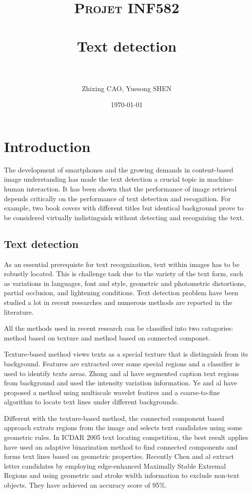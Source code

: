 \documentclass[paper=a4, french, 11pt]{scrartcl}
\title{	
\normalfont \normalsize 
\textsc{Projet INF582} \\ [25pt] 
\horrule{0.5pt} \\[0.5cm] %
\huge Text detection \\ %
\horrule{2pt} \\[0.5cm] %
}
\author{Zhixing CAO, Yuesong SHEN} %
\date{\normalsize\today} %
\begin{document}
\setlength\parindent{12pt}
\maketitle %

\section{Introduction}
The development of smartphones and the growing demands in content-based image understanding has made the text detection a crucial topic in machine-human interaction. It has been shown that the performance of image retrieval depends critically on the performance of text detection and recognition. For example, two book covers with different titles but identical background prove to be considered virtually indistinguish without detecting and recognizing the text.  
\subsection{Text detection}
As an essential prerequiste for text recognization, text within images has to be robustly located. This is challenge task due to the variety of the text form, such as variations in languages, font and style, geometric and photometric distortions, partial occlusion, and lightening conditions. Text detection problem have been studied a lot in recent researches and numerous methods are reported in the literature.

All the methods used in recent research can be classified into two catagories: method based on texture and method based on connected componet.

Texture-based method views texts as a special texture that is distinguish from its background. Features are extracted over some special regions and a classifier is used to identify texts areas. Zhong and al have segmented caption text regions from background and used the intensity variation information. Ye and al have proposed a method using multiscale wavelet featires and a coarse-to-fine algorithm to locate text lines under different backgrounds.

Different with the texture-based method, the connected component based approach extrats regions from the image and selects text candidates using some geometric rules. In ICDAR 2005 text locating competition, the best result applies have used an adaptive binarization method to find connected components and forms text lines based on geometric properties. Recently Chen and al extract letter candidates by employing edge-enhanced Maximally Stable Extremal Regions and using geometric and stroke width information to exclude non-text objects. They have achieved an accuracy score of 95\%.
\end{document}

